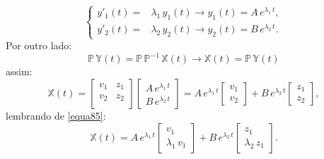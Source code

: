 \documentclass[12pt,openright,twoside,english,brazil]{abntex2}
\begin{document}
\begin{equation}
 \begin{cases}
  y'_1(t) = & \lambda_1 \, y_1(t) \rightarrow y_1(t) = A\, e^{\lambda_1\, t}, \\
  y'_2(t) = & \lambda_2 \, y_2(t) \rightarrow y_2(t) = B\, e^{\lambda_2\, t}.
 \end{cases}
 \label{equa90}
\end{equation}
Por outro lado:
\begin{equation}
 \mathbb{P}\, \mathbb{Y}(t) = \mathbb{P}\, \mathbb{P}^{-1}\, \mathbb{X}(t) \rightarrow \mathbb{X}(t) = \mathbb{P}\, \mathbb{Y}(t)
 \label{equa91}
\end{equation}
assim:
\begin{equation}
 \mathbb{X}(t) = \begin{bmatrix}
         v_1 & z_1 \\
         v_2 & z_2 \\
         \end{bmatrix} \begin{bmatrix}
                        A\, e^{\lambda_1\, t} \\
                        B\, e^{\lambda_2\, t}
                       \end{bmatrix} = A\, e^{\lambda_1\, t} \begin{bmatrix}
                        v_1 \\
                        v_2
                       \end{bmatrix} + B\, e^{\lambda_2\, t} \begin{bmatrix}
                        z_1 \\                                         
                        z_2
                       \end{bmatrix},
 \label{equa92}
\end{equation}
lembrando de \ref{equa85}:
\begin{equation}
 \mathbb{X}(t) = A\, e^{\lambda_1\, t} \begin{bmatrix}
                               v_1 \\
                               \lambda_1 \, v_1
                               \end{bmatrix} + B\,  e^{\lambda_2\, t}\begin{bmatrix}
                                z_1 \\
                                \lambda_2 \, z_1
                               \end{bmatrix}.
 \label{equa93}
\end{equation}
\end{document}
